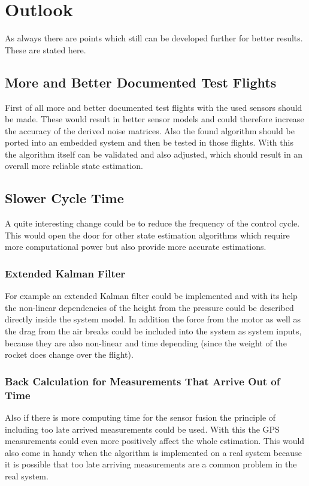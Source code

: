 \section{Outlook}
As always there are points which still can be developed further for better results. These are stated here.

\subsection{More and Better Documented Test Flights}
First of all more and better documented test flights with the used sensors should be made.
These would result in better sensor models and could therefore increase the accuracy of the derived noise matrices.
Also the found algorithm should be ported into an embedded system and then be tested in those flights.
With this the algorithm itself can be validated and also adjusted, which should result in an overall more reliable state estimation.

\subsection{Slower Cycle Time}
A quite interesting change could be to reduce the frequency of the control cycle.
This would open the door for other state estimation algorithms which require more computational power but also provide more accurate estimations.

\subsubsection{Extended Kalman Filter}
For example an extended Kalman filter could be implemented and with its help the non-linear dependencies of the height from the pressure
could be described directly inside the system model.
In addition the force from the motor as well as the drag from the air breaks could be included into the system as system inputs, because they are also non-linear and time depending (since the weight of the rocket does change over the flight).

\subsubsection{Back Calculation for Measurements That Arrive Out of Time}
Also if there is more computing time for the sensor fusion the principle of including too late arrived measurements could be used.
With this the GPS measurements could even more positively affect the whole estimation.
This would also come in handy when the algorithm is implemented on a real system because
it is possible that too late arriving measurements are a common problem in the real system.

